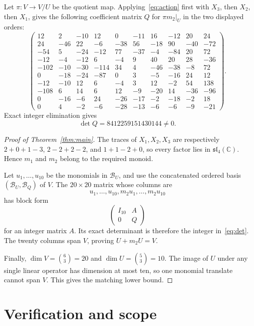 \documentclass[11pt]{article}
\newcommand{\C}{\mathbb{C}}
\newcommand{\slie}{\mathfrak{sl}}
\begin{document}
Let $\pi:V\to V/U$ be the quotient map.  Applying~\eqref{eq:action} first
with $X_3$, then $X_2$, then $X_1$, gives the following coefficient matrix
$Q$ for $\pi m_2|_U$ in the two displayed orders:
\[
\begin{pmatrix}
  12&   2&-10&  12&  0&-11& 16&-12& 20& 24\\
  24& -46& 22&  -6&-38& 56&-18& 90&-40&-72\\
 -54&   5&-24& -12& 77&-37& -4&-84& 20& 72\\
 -12&  -4&-12&   6& -4&  9& 40& 20& 28&-36\\
-102& -10&-30&-114& 34&  4&-46&-38& -8& 72\\
   0& -18&-24& -87&  0&  3& -5&-16& 24& 12\\
 -12& -10& 12&   6& -4&  3& 12& -2& 54&138\\
-108&   6& 14&   6& 12& -9&-20& 14&-36&-96\\
   0& -16& -6&  24&-26&-17& -2&-18& -2& 18\\
   0&   4& -2&  -6&-28&-13& -6& -6& -9&-21
\end{pmatrix}.
\]
Exact integer elimination gives
\begin{equation}\label{eq:det}
 \det Q=8412259151430144\neq0.
\end{equation}

\begin{proof}[Proof of Theorem~\ref{thm:main}]
The traces of $X_1,X_2,X_3$ are respectively
$2+0+1-3$, $2-2+2-2$, and $1+1-2+0$, so every factor lies in
$\slie_4(\C)$.  Hence $m_1$ and $m_2$ belong to the required monoid.

Let $u_1,\ldots,u_{10}$ be the monomials in $\mathcal B_U$, and use the
concatenated ordered basis $(\mathcal B_U,\mathcal B_Q)$ of $V$.  The
$20\times20$ matrix whose columns are
\[
 u_1,\ldots,u_{10},m_2u_1,\ldots,m_2u_{10}
\]
has block form
\[
 \begin{pmatrix}I_{10}&A\\0&Q\end{pmatrix}
\]
for an integer matrix $A$.  Its exact determinant is therefore the integer
in~\eqref{eq:det}.  The twenty columns span $V$, proving
$U+m_2U=V$.

Finally,
$\dim V=\binom{6}{3}=20$ and $\dim U=\binom{5}{3}=10$.  The image of $U$
under any single linear operator has dimension at most ten, so one monomial
translate cannot span $V$.  This gives the matching lower bound.
\end{proof}

\section{Verification and scope}
\end{document}
